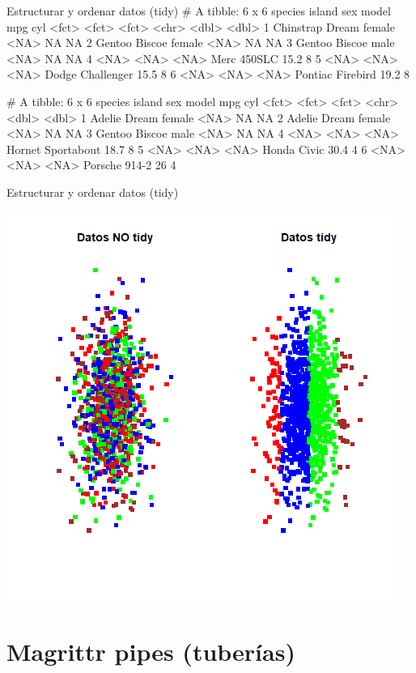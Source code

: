 \documentclass[
  ignorenonframetext,
  aspectratio=169]{beamer}
\let\oldverbatim\verbatim
\let\endoldverbatim\endverbatim
\renewenvironment{verbatim}{\tiny\oldverbatim}{\endoldverbatim}
\begin{document}
\begin{frame}[fragile]{Estructurar y ordenar datos (tidy)}
\label{estructurar-y-ordenar-datos-tidy-2}
\begin{verbatim}
# A tibble: 6 x 6
  species   island sex    model              mpg   cyl
  <fct>     <fct>  <fct>  <chr>            <dbl> <dbl>
1 Chinstrap Dream  female <NA>              NA      NA
2 Gentoo    Biscoe female <NA>              NA      NA
3 Gentoo    Biscoe male   <NA>              NA      NA
4 <NA>      <NA>   <NA>   Merc 450SLC       15.2     8
5 <NA>      <NA>   <NA>   Dodge Challenger  15.5     8
6 <NA>      <NA>   <NA>   Pontiac Firebird  19.2     8
\end{verbatim}

\begin{verbatim}
# A tibble: 6 x 6
  species island sex    model               mpg   cyl
  <fct>   <fct>  <fct>  <chr>             <dbl> <dbl>
1 Adelie  Dream  female <NA>               NA      NA
2 Adelie  Dream  female <NA>               NA      NA
3 Gentoo  Biscoe male   <NA>               NA      NA
4 <NA>    <NA>   <NA>   Hornet Sportabout  18.7     8
5 <NA>    <NA>   <NA>   Honda Civic        30.4     4
6 <NA>    <NA>   <NA>   Porsche 914-2      26       4
\end{verbatim}
\end{frame}

\begin{frame}{Estructurar y ordenar datos (tidy)}
\label{estructurar-y-ordenar-datos-tidy-3}
\begin{center}\includegraphics[width=0.5\linewidth]{Imgs/plot_tidy} \end{center}
\end{frame}

\section{Magrittr pipes (tuberías)}\label{magrittr-pipes-tuberuxedas}
\end{document}
